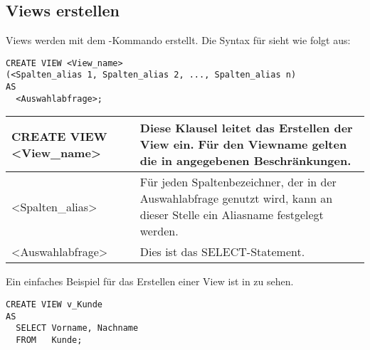       \subsection{Views erstellen}
        Views werden mit dem -Kommando erstellt. Die Syntax f\"ur  sieht wie folgt aus:
        \begin{lstlisting}[language=oracle_sql,caption={Die Syntax von CREATE VIEW},label=sql08_24]
CREATE VIEW <View_name>
(<Spalten_alias 1, Spalten_alias 2, ..., Spalten_alias n)
AS
  <Auswahlabfrage>;
        \end{lstlisting}
        \begin{center}
          \label{createviewsyntax}
          \begin{small}
            \tabletail{
              \hline
            }
            \tablelasttail{
              \hline
            }
            \begin{supertabular}{|l|p{9.45cm}|}
              CREATE VIEW <View\_name> & Diese Klausel leitet das Erstellen der View ein. F\"ur den Viewname gelten die in  angegebenen Beschr\"ankungen. \\
              \hline
              <Spalten\_alias> & F\"ur jeden Spaltenbezeichner, der in der Auswahlabfrage genutzt wird, kann an dieser Stelle ein Aliasname festgelegt werden.\\
              \hline
              <Auswahlabfrage> & Dies ist das SELECT-Statement. \\
            \end{supertabular}
          \end{small}
        \end{center}
        Ein einfaches Beispiel f\"ur das Erstellen einer View ist in  zu sehen.
        \begin{lstlisting}[language=oracle_sql,caption={Eine einfache View},label=sql08_25]
CREATE VIEW v_Kunde
AS
  SELECT Vorname, Nachname
  FROM   Kunde;
        \end{lstlisting}
